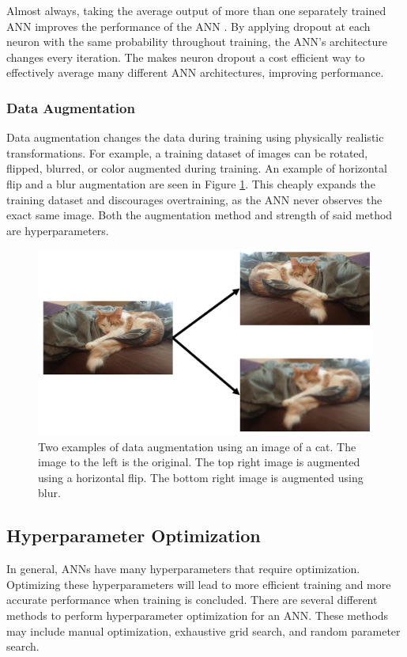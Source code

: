 Almost always, taking the average output of more than one separately trained ANN improves the performance of the ANN \cite{Srivastava2014}. By applying dropout at each neuron with the same probability throughout training, the ANN's architecture changes every iteration. The makes neuron dropout a cost efficient way to effectively average many different ANN architectures, improving performance.

\subsubsection{Data Augmentation}

Data augmentation changes the data during training using physically realistic transformations. For example, a training dataset of images can be rotated, flipped, blurred, or color augmented during training. An example of horizontal flip and a blur augmentation are seen in Figure \ref{fig:cat}. This cheaply expands the training dataset and discourages overtraining, as the ANN never observes the exact same image. Both the augmentation method and strength of said method are hyperparameters. 

\begin{figure}[H]
	\centering
	\includegraphics[width=0.9\linewidth]{images/cat}
	\caption{Two examples of data augmentation using an image of a cat. The image to the left is the original. The top right image is augmented using a horizontal flip. The bottom right image is augmented using blur.}
	\label{fig:cat}
\end{figure}

\subsection{Hyperparameter Optimization}

In general, ANNs have many hyperparameters that require optimization. Optimizing these hyperparameters will lead to more efficient training and more accurate performance when training is concluded. There are several different methods to perform hyperparameter optimization for an ANN. These methods may include manual optimization, exhaustive grid search, and random parameter search.

